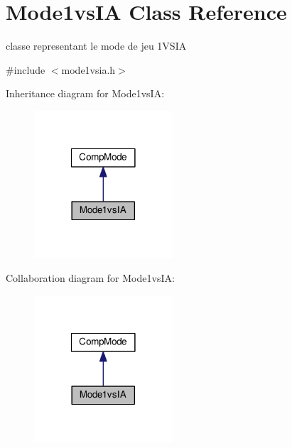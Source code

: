 \hypertarget{classMode1vsIA}{\section{Mode1vs\+I\+A Class Reference}
\label{classMode1vsIA}
}


classe representant le mode de jeu 1\+V\+S\+I\+A  




{\ttfamily \#include $<$mode1vsia.\+h$>$}



Inheritance diagram for Mode1vs\+I\+A\+:
\nopagebreak
\begin{figure}[H]
\begin{center}
\leavevmode
\includegraphics[width=146pt]{classMode1vsIA__inherit__graph}
\end{center}
\end{figure}


Collaboration diagram for Mode1vs\+I\+A\+:
\nopagebreak
\begin{figure}[H]
\begin{center}
\leavevmode
\includegraphics[width=146pt]{classMode1vsIA__coll__graph}
\end{center}
\end{figure}
